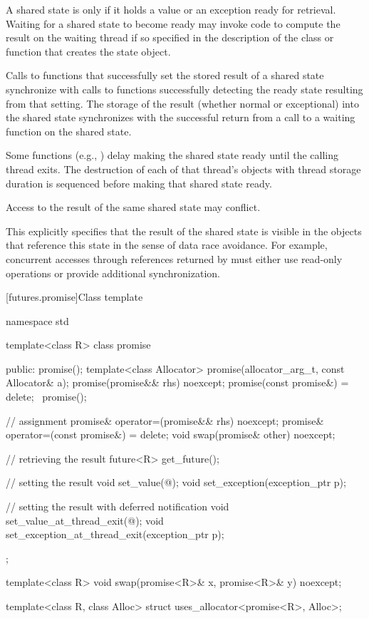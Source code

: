 \pnum
A shared state is  only if it holds a value or an exception ready for
retrieval.
Waiting for a shared state to become ready may invoke code to compute the result on
the waiting thread if so specified in the description of the class or function that creates
the state object.

\pnum
Calls to functions that successfully set the stored result of a shared
state synchronize
with calls to functions
successfully detecting the ready state resulting from that setting.
The storage of the result
(whether normal or exceptional) into the shared state
synchronizes with
the successful return from a call to a waiting function on the shared state.

\pnum
Some functions (e.g., ) delay making
the shared state ready until the calling thread exits. The destruction of
each of that thread's objects with thread storage duration
is sequenced before making that shared state ready.

\pnum
Access to the result of the same shared state may conflict.
\begin{note}
This explicitly specifies that the result of the shared state is
visible in the objects that reference this state in the sense of data race
avoidance. For example, concurrent accesses through
references returned by 
must either use read-only operations or provide additional synchronization.
\end{note}

[futures.promise]{Class template }

%
\begin{codeblock}
namespace std {
  template<class R>
  class promise {
  public:
    promise();
    template<class Allocator>
      promise(allocator_arg_t, const Allocator& a);
    promise(promise&& rhs) noexcept;
    promise(const promise&) = delete;
    ~promise();

    // assignment
    promise& operator=(promise&& rhs) noexcept;
    promise& operator=(const promise&) = delete;
    void swap(promise& other) noexcept;

    // retrieving the result
    future<R> get_future();

    // setting the result
    void set_value(@\seebelow@);
    void set_exception(exception_ptr p);

    // setting the result with deferred notification
    void set_value_at_thread_exit(@\seebelow@);
    void set_exception_at_thread_exit(exception_ptr p);
  };

  template<class R>
    void swap(promise<R>& x, promise<R>& y) noexcept;

  template<class R, class Alloc>
    struct uses_allocator<promise<R>, Alloc>;
}
\end{codeblock}

